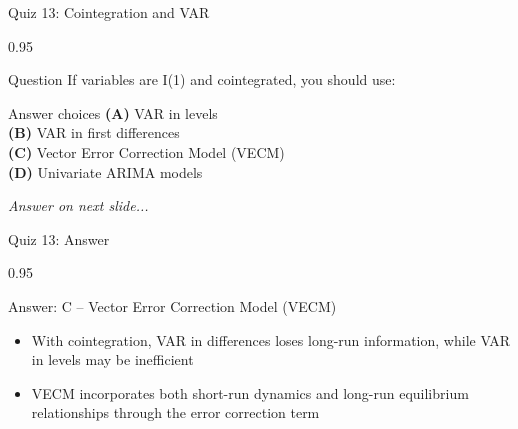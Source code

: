 \documentclass[9pt, aspectratio=169, t]{beamer}
\begin{document}
\begin{frame}{Quiz 13: Cointegration and VAR}
    \begin{cminipage}{0.95\textwidth}
    \begin{alertblock}{Question}
        If variables are I(1) and cointegrated, you should use:
    \end{alertblock}

    \vspace{0.4cm}

    \begin{block}{Answer choices}
        \textcolor{MainBlue}{\textbf{(A)}} VAR in levels\\[3pt]
        \textcolor{MainBlue}{\textbf{(B)}} VAR in first differences\\[3pt]
        \textcolor{MainBlue}{\textbf{(C)}} Vector Error Correction Model (VECM)\\[3pt]
        \textcolor{MainBlue}{\textbf{(D)}} Univariate ARIMA models
    \end{block}

    \vspace{0.5cm}

    \begin{center}
        \textit{Answer on next slide...}
    \end{center}
    \end{cminipage}
\end{frame}

\begin{frame}{Quiz 13: Answer}
    \begin{cminipage}{0.95\textwidth}
    \begin{exampleblock}{Answer: C -- Vector Error Correction Model (VECM)}
        \begin{itemize}
            \item With cointegration, VAR in differences loses long-run information, while VAR in levels may be inefficient
            \item VECM incorporates both short-run dynamics and long-run equilibrium relationships through the error correction term
        \end{itemize}
    \end{exampleblock}

    \end{cminipage}
\end{frame}
\end{document}

